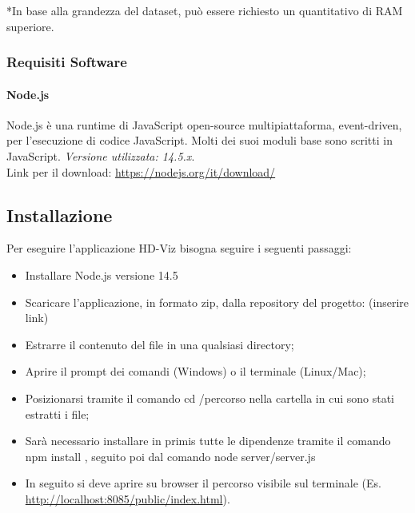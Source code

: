 \documentclass[../manuale_sviluppatore.tex]{subfiles}
\begin{document}
*In base alla grandezza del dataset, può essere richiesto un quantitativo di RAM superiore.

\subsubsection{Requisiti Software}
    \label{subsub:req_s}
\paragraph{Node.js}
    \label{par:node}
Node.js è una runtime di JavaScript open-source multipiattaforma, event-driven, per l’esecuzione di codice JavaScript. Molti dei suoi moduli base sono scritti in JavaScript. 
\emph{Versione utilizzata: 14.5.x}.\\
Link per il download: \url{https://nodejs.org/it/download/}

\subsection{Installazione}
    \label{sub:inst}

Per eseguire l’applicazione HD-Viz bisogna seguire i seguenti passaggi:
\begin{itemize}
\item Installare Node.js versione 14.5
\item Scaricare l’applicazione, in formato zip, dalla repository del progetto: (inserire link)
\item Estrarre il contenuto del file in una qualsiasi directory; 
\item Aprire il prompt dei comandi (Windows) o il terminale (Linux/Mac); 
\item Posizionarsi tramite il comando cd /percorso nella cartella in cui sono stati estratti i file;
\item Sarà necessario installare in primis tutte le dipendenze tramite il comando npm install , seguito poi dal comando node server/server.js
\item In seguito si deve aprire su browser il percorso visibile sul terminale (Es. \url{http://localhost:8085/public/index.html}).
\end{itemize}
\end{document}
